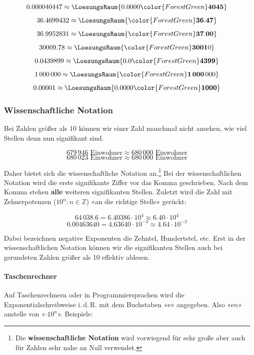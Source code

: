$$0.000040447  \approx \LoesungsRaum{0.0000{\color{ForestGreen}\mathbf{4045}}}$$
$$36.4699432 \approx \LoesungsRaum{{\color{ForestGreen}\mathbf{36.47}}}$$
$$36.9952831 \approx \LoesungsRaum{{\color{ForestGreen}\mathbf{37.00}}}$$
$$30009.78   \approx \LoesungsRaum{{\color{ForestGreen}\mathbf{3001}}0}$$
$$0.0439899  \approx \LoesungsRaum{0.0{\color{ForestGreen}\mathbf{4399}}}$$
$$1\,000\,000 \approx \LoesungsRaum{{\color{ForestGreen}\mathbf{1\,000}}\,000}$$
$$0.00001    \approx \LoesungsRaum{0.0000{\color{ForestGreen}\mathbf{1000}}}$$
\newpage

  
\subsubsection{Wissenschaftliche Notation}\label{wissenschaftlicheNotation}
Bei Zahlen größer als 10 können wir einer Zahl manchmal nicht ansehen, wie viel Stellen denn nun signifikant sind.

$$ 679\,946 \textrm{\ Einwohner} \approx  680\,000 \textrm{\ Einwohner}$$
$$ 680\,023 \textrm{\ Einwohner} \approx  680\,000 \textrm{\ Einwohner}$$

Daher bietet sich die wissenschaftliche Notation an.\footnote{Die
\textbf{wissenschaftliche Notation} wird vorwiegend für sehr große
aber auch für Zahlen sehr nahe an Null verwendet.}
Bei der wissenschaftlichen Notation wird die erste signifikante Ziffer
vor das Komma geschrieben. Nach dem Komma stehen \textbf{alle} weiteren signifikanten Stellen.
Zuletzt wird die Zahl mit Zehnerpotenzen
($10^{n}: n \in \mathbb{Z}$) «an die richtige Stelle» gerückt:

$$64\,038.6  = 6.40386 \cdot 10^{ 4}\approx 6.40 \cdot 10^{ 4}$$
$$0.00463640 = 4.63640 \cdot 10^{-3}\approx 4.64 \cdot 10^{-3}$$

Dabei bezeichnen negative Exponenten die Zehntel, Hundertstel, etc.
Erst in der wissenschaftlichen Notation können wir die signifikanten Stellen auch bei gerundeten Zahlen größer als 10 effektiv ablesen.



\paragraph{Taschenrechner} Auf Taschenrechnern oder in
Programmiersprachen wird die Exponentialschreibweise i.\,d.\,R. mit dem
Buchstaben «e» angegeben. Also «e$n$» anstelle von «$\cdot10^{n}$». Beispiele:

